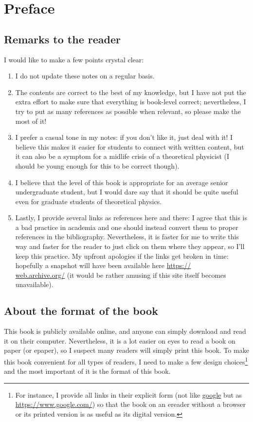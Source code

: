 \chapter{Preface}
\sidebar{\vspace*{\baselineskip}}
\section{Remarks to the reader}
I would like to make a few points crystal clear:
\begin{enumerate}
	\item I do not update these notes on a regular basis.
	\item The contents are correct to the best of my knowledge, but I have not put the extra effort to make sure that everything is book-level correct; nevertheless, I try to put as many references as possible when relevant, so please make the most of it!
	\item I prefer a casual tone in my notes: if you don't like it, just deal with it! I believe this makes it easier for students to connect with written content, but it can also be a symptom for a midlife crisis of a theoretical physicist (I should be young enough for this to be correct though). 
	\item I believe that the level of this book is appropriate for an average senior undergraduate student, but I would dare say that it should be quite useful even for graduate students of theoretical physics. 
	\item Lastly, I provide several links as references here and there: I agree that this is a bad practice in academia and one should instead convert them to proper references in the bibliography. Nevertheless, it is faster for me to write this way and faster for the reader to just click on them where they appear, so I'll keep this practice. My upfront apologies if the links get broken in time: hopefully a snapshot will have been available here \href{https://web.archive.org/}{https://\\web.archive.org/} (it would be rather amusing if this site itself becomes unavailable).
\end{enumerate}
\section{About the format of the book}
This book is publicly available online, and anyone can simply download and read it on their computer. Nevertheless, it is a lot easier on eyes to read a book on paper (or epaper), so I suspect many readers will simply print this book. To make this book convenient for all types of readers, I need to make a few design choices\footnote{For instance, I provide all links in their explicit form (not like \href{https://www.google.com/}{google} but as \href{https://www.google.com/}{https://www.google.com/}) so that the book on an ereader without a browser or its printed version is as useful as its digital version.} and the most important of it is the format of this book.

